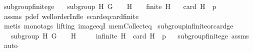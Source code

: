 \begin{isabellebody}
\isanewline
{}\isamarkupfalse%
\ subgroup{\isacharunderscore}{\kern0pt}finite{\isacharunderscore}{\kern0pt}ge{\isacharcolon}{\kern0pt}\isanewline
\ \ \ {\isachardoublequoteopen}subgroup\ H\ G\ {\isacharparenleft}{\kern0pt}{\isasymcdot}{\isacharparenright}{\kern0pt}\ {\isasymone}{\isachardoublequoteclose}\ \ {\isachardoublequoteopen}H\ {\isasymnoteq}\ {\isacharbraceleft}{\kern0pt}{\isasymone}{\isacharbraceright}{\kern0pt}{\isachardoublequoteclose}\ \ {\isachardoublequoteopen}finite\ H{\isachardoublequoteclose}\isanewline
\ \ \ {\isachardoublequoteopen}card\ H\ {\isasymge}\ p{\isachardoublequoteclose}\isanewline
%
\isadelimproof
\ \ %
\endisadelimproof
%
\isatagproof
{}\isamarkupfalse%
\ assms\ p{\isacharunderscore}{\kern0pt}def\ wellorder{\isacharunderscore}{\kern0pt}Inf{\isacharunderscore}{\kern0pt}le{}\ ecard{\isacharunderscore}{\kern0pt}eq{\isacharunderscore}{\kern0pt}card{\isacharunderscore}{\kern0pt}finite\isanewline
\ \ \ \ \isamarkupfalse%
\ {\isacharparenleft}{\kern0pt}metis\ {\isacharparenleft}{\kern0pt}mono{\isacharunderscore}{\kern0pt}tags{\isacharcomma}{\kern0pt}\ lifting{\isacharparenright}{\kern0pt}\ image{\isacharunderscore}{\kern0pt}eqI\ mem{\isacharunderscore}{\kern0pt}Collect{\isacharunderscore}{\kern0pt}eq{\isacharparenright}{\kern0pt}%
\endisatagproof
{\isafoldproof}%
%
\isadelimproof
\isanewline
%
\endisadelimproof
\isanewline
{}\isamarkupfalse%
\ subgroup{\isacharunderscore}{\kern0pt}infinite{\isacharunderscore}{\kern0pt}or{\isacharunderscore}{\kern0pt}card{\isacharunderscore}{\kern0pt}ge{\isacharcolon}{\kern0pt}\isanewline
\ \ \ {\isachardoublequoteopen}subgroup\ H\ G\ {\isacharparenleft}{\kern0pt}{\isasymcdot}{\isacharparenright}{\kern0pt}\ {\isasymone}{\isachardoublequoteclose}\ \ {\isachardoublequoteopen}H\ {\isasymnoteq}\ {\isacharbraceleft}{\kern0pt}{\isasymone}{\isacharbraceright}{\kern0pt}{\isachardoublequoteclose}\isanewline
\ \ \ {\isachardoublequoteopen}infinite\ H\ {\isasymor}\ card\ H\ {\isasymge}\ p{\isachardoublequoteclose}%
\isadelimproof
\ %
\endisadelimproof
%
\isatagproof
{}\isamarkupfalse%
\ subgroup{\isacharunderscore}{\kern0pt}finite{\isacharunderscore}{\kern0pt}ge\ assms\ \isamarkupfalse%
\ auto%
\endisatagproof
{\isafoldproof}%
%
\isadelimproof
%
\endisadelimproof
\isanewline
\isanewline
{}\isamarkupfalse%
%
\isadelimdocument
%
\endisadelimdocument
%
\isatagdocument
%
\end{isabellebody}
